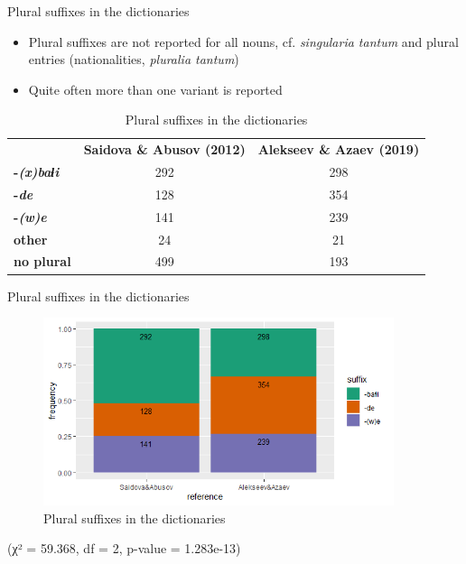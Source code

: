 \begin{frame}{Plural suffixes in the dictionaries}
\begin{itemize}
    \item Plural suffixes are not reported for all nouns, cf. \textit{singularia tantum} and plural entries (nationalities, \textit{pluralia tantum})
    \item Quite often more than one variant is reported
\end{itemize}
\begin{table}[]
\caption{Plural suffixes in the dictionaries}
\centering
\begin{tabular}{lcc}
          & \multicolumn{1}{l}{\textbf{Saidova \& Abusov (2012)}} & \multicolumn{1}{l}{\textbf{Alekseev \& Azaev (2019)}} \\
\textbf{-\textit{(x)baɬi}}  & 292                                          & 298                                          \\
\textbf{-\textit{de}}       & 128                                          & 354                                          \\
\textbf{-\textit{(w)e}}     & 141                                          & 239                                          \\
\textbf{other}     & 24                                           & 21                                           \\
\textbf{no plural} & 499                                          & 193                                         
\end{tabular}
\end{table}
\end{frame}

\begin{frame}{Plural suffixes in the dictionaries}
\begin{figure}[h]
\caption{Plural suffixes in the dictionaries}
\centering
\includegraphics[height=5.5cm]{images/plural.png}
\end{figure}
\centering
\small (χ² = 59.368, df = 2, p-value = 1.283e-13)
\end{frame}

